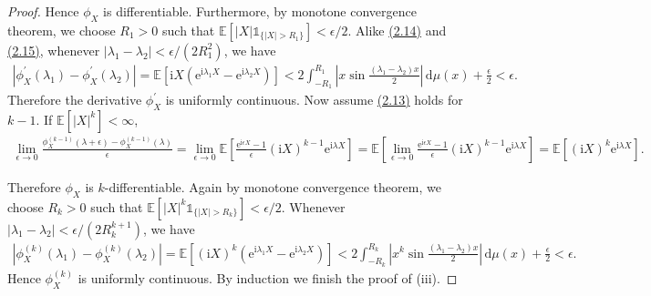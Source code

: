 \documentclass{article}
\numberwithin{equation}{section}
\newcommand{\e}{\mathrm{e}}
\newcommand{\E}{\mathbb{E}}
\renewcommand{\d}{\mathrm{d}}
\renewcommand{\i}{\mathrm{i}}
\theoremstyle{plain}
\theoremstyle{definition}
\begin{document}
\begin{proof}
Hence $\phi_X$ is differentiable. Furthermore, by monotone convergence theorem, we choose $R_1>0$ such that $\E[\vert X\vert\mathds{1}_{\{\vert X\vert>R_1\}}] < \epsilon/2$. Alike \hyperref[eq:2.14]{(2.14)} and \hyperref[eq:2.15]{(2.15)}, whenever $\vert\lambda_1-\lambda_2\vert<\epsilon/(2R_1^2)$, we have
\begin{align*}
	\left\vert\phi_X^\prime(\lambda_1)-\phi_X^\prime(\lambda_2)\right\vert = \E\left[\i X(\e^{\i\lambda_1 X}-\e^{\i\lambda_2 X})\right] < 2\int_{-R_1}^{R_1}\left\vert x\sin\frac{(\lambda_1-\lambda_2)x}{2}\right\vert\,\d \mu(x) + \frac{\epsilon}{2} < \epsilon.
\end{align*}
Therefore the derivative $\phi_X^\prime$ is uniformly continuous. Now assume \hyperref[eq:2.13]{(2.13)} holds for $k-1$. If $\E[\vert X\vert^k]<\infty$,
\begin{align*}
	\lim_{\epsilon\to 0}\frac{\phi_X^{(k-1)}(\lambda+\epsilon)-\phi_X^{(k-1)}(\lambda)}{\epsilon} = \lim_{\epsilon\to 0}\E\left[\frac{\e^{\i\epsilon X}-1}{\epsilon}(\i X)^{k-1}\e^{\i\lambda X}\right] = \E\left[\lim_{\epsilon\to 0}\frac{\e^{\i\epsilon X}-1}{\epsilon}(\i X)^{k-1}\e^{\i\lambda X}\right] = \E\left[(\i X)^k\e^{\i\lambda X}\right].
\end{align*}

Therefore $\phi_X$ is $k$-differentiable. Again by monotone convergence theorem, we choose $R_k>0$ such that $\E[\vert X\vert^k\mathds{1}_{\{\vert X\vert>R_k\}}] < \epsilon/2$. Whenever $\vert\lambda_1-\lambda_2\vert<\epsilon/(2R_k^{k+1})$, we have
\begin{align*}
	\left\vert\phi_X^{(k)}(\lambda_1)-\phi_X^{(k)}(\lambda_2)\right\vert = \E\left[(\i X)^k(\e^{\i\lambda_1 X}-\e^{\i\lambda_2 X})\right] < 2\int_{-R_k}^{R_k}\left\vert x^k\sin\frac{(\lambda_1-\lambda_2)x}{2}\right\vert\,\d \mu(x) + \frac{\epsilon}{2} < \epsilon.
\end{align*}
Hence $\phi_X^{(k)}$ is uniformly continuous. By induction we finish the proof of (iii). \vspace{0.1cm}


\end{proof}
\end{document}
